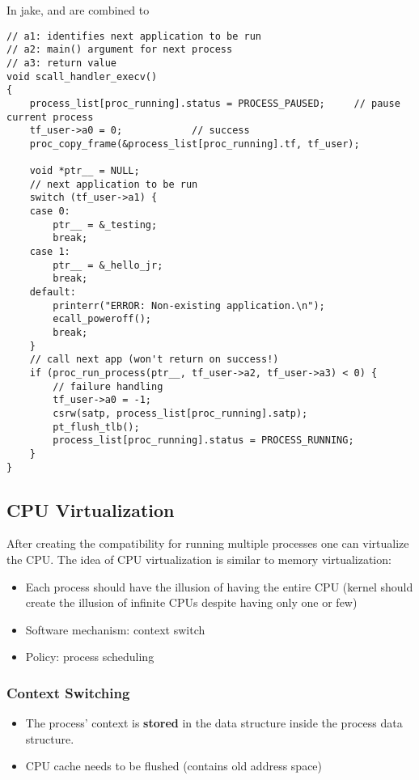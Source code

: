 In jake,  and  are combined to 
\begin{lstlisting}[style=bright_C++]
// a1: identifies next application to be run
// a2: main() argument for next process
// a3: return value
void scall_handler_execv()
{
    process_list[proc_running].status = PROCESS_PAUSED;     // pause current process
    tf_user->a0 = 0;            // success                                    
    proc_copy_frame(&process_list[proc_running].tf, tf_user);

    void *ptr__ = NULL;
    // next application to be run
    switch (tf_user->a1) {
    case 0:
        ptr__ = &_testing;
        break;
    case 1:
        ptr__ = &_hello_jr;
        break;
    default:
        printerr("ERROR: Non-existing application.\n");
        ecall_poweroff();
        break;
    }
    // call next app (won't return on success!)
    if (proc_run_process(ptr__, tf_user->a2, tf_user->a3) < 0) {
        // failure handling
        tf_user->a0 = -1;
        csrw(satp, process_list[proc_running].satp);
        pt_flush_tlb();
        process_list[proc_running].status = PROCESS_RUNNING;
    }
}
\end{lstlisting}

\subsection{CPU Virtualization}
After creating the compatibility for running multiple processes one can virtualize the CPU. The idea of CPU virtualization is similar to memory virtualization:
\begin{itemize}
    \item Each process should have the illusion of having the entire CPU (kernel should create the illusion of infinite CPUs despite having only one or few)
    \item Software mechanism: context switch
    \item Policy: process scheduling
\end{itemize}
\subsubsection{Context Switching}
\begin{itemize}
    \item The process' context is \textbf{stored} in the  data structure inside the process data structure.
    \item CPU cache needs to be flushed (contains old address space)
\end{itemize}

